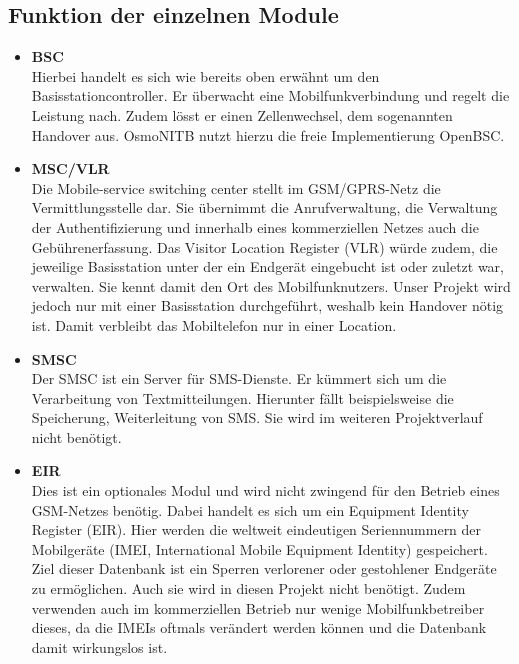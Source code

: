 \subsection{Funktion der einzelnen Module}




\begin{itemize}

\item \textbf{BSC}\\
Hierbei handelt es sich wie bereits oben erwähnt um den Basisstationcontroller. Er überwacht eine Mobilfunkverbindung und regelt die Leistung nach. Zudem lösst er einen Zellenwechsel, dem sogenannten Handover aus. OsmoNITB nutzt hierzu die freie Implementierung OpenBSC.  

 
\item \textbf{MSC/VLR}\\
Die Mobile-service switching center stellt im GSM/GPRS-Netz die Vermittlungsstelle dar. Sie übernimmt die Anrufverwaltung, die Verwaltung der Authentifizierung und innerhalb eines kommerziellen Netzes auch die Gebührenerfassung. Das Visitor Location Register (VLR) würde zudem, die jeweilige Basisstation unter der ein Endgerät eingebucht ist oder zuletzt war, verwalten. Sie kennt damit den Ort des Mobilfunknutzers. Unser Projekt wird jedoch nur mit einer Basisstation durchgeführt, weshalb kein Handover nötig ist. Damit verbleibt das Mobiltelefon nur in einer Location. 


\item \textbf{SMSC}\\
Der SMSC ist ein Server für SMS-Dienste. Er kümmert sich um die Verarbeitung von Textmitteilungen. Hierunter fällt beispielsweise die Speicherung, Weiterleitung von SMS. Sie wird im weiteren Projektverlauf nicht benötigt.


\item \textbf{EIR}\\
Dies ist ein optionales Modul und wird nicht zwingend für den Betrieb eines GSM-Netzes benötig. Dabei handelt es sich um ein Equipment Identity Register (EIR). Hier werden die weltweit eindeutigen Seriennummern der Mobilgeräte (IMEI, International Mobile Equipment Identity) gespeichert. Ziel dieser Datenbank ist ein Sperren verlorener oder gestohlener Endgeräte zu ermöglichen. Auch sie wird in diesen Projekt nicht benötigt. Zudem verwenden auch im kommerziellen Betrieb nur wenige Mobilfunkbetreiber dieses, da die IMEIs oftmals verändert werden können und die Datenbank damit wirkungslos ist.  



\end{itemize}
